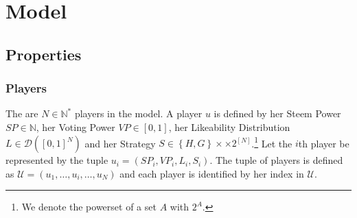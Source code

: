\section{Model}
  \subsection{Properties}
    \subsubsection*{Players}
      The are $N \in \mathbb{N}^{*}$ players in the model. A player $u$ is
      defined by her Steem Power $SP \in \mathbb{N}$, her Voting Power $VP \in
      \left[0, 1\right]$, her Likeability Distribution $L \in \mathcal{D}
      \left(\left[0, 1\right]^N\right)$ and her Strategy $S \in \left\{H,
      G\right\} \times \times 2^{\left[N\right]}$.\footnote{We denote the
      powerset of a set $A$ with $2^A$.} Let the $i$th player be represented by
      the tuple $u_i = \left(SP_i, VP_i, L_i, S_i\right)$. The tuple of players
      is defined as $\mathcal{U} = \left(u_1, \dots, u_i, \dots, u_N\right)$ and
      each player is identified by her index in $\mathcal{U}$.

